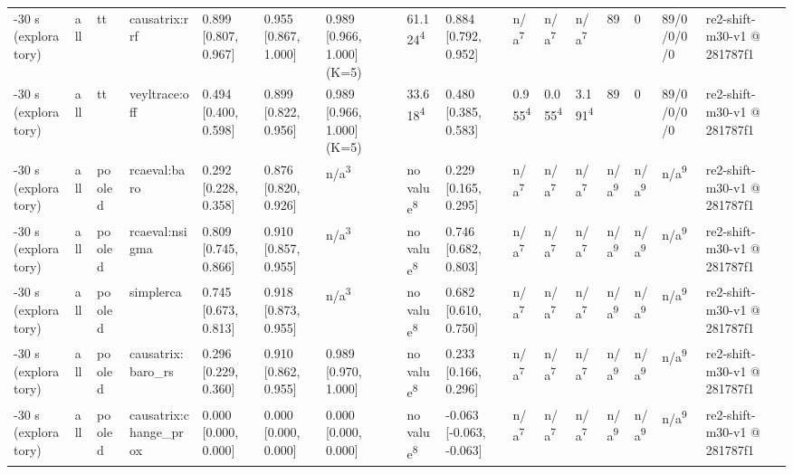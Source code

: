 \begin{table}[t]
\begin{tabular}{llllllllllllllll}
-30 s (exploratory) & all & tt & causatrix:rrf & 0.899 [0.807, 0.967] & 0.955 [0.867, 1.000] & 0.989 [0.966, 1.000] (K=5) & 61.124\textsuperscript{4} & 0.884 [0.792, 0.952] & n/a\textsuperscript{7} & n/a\textsuperscript{7} & n/a\textsuperscript{7} & 89 & 0 & 89/0/0/0/0 & re2-shift-m30-v1 @ 281787f1 \\
-30 s (exploratory) & all & tt & veyltrace:off & 0.494 [0.400, 0.598] & 0.899 [0.822, 0.956] & 0.989 [0.966, 1.000] (K=5) & 33.618\textsuperscript{4} & 0.480 [0.385, 0.583] & 0.955\textsuperscript{4} & 0.055\textsuperscript{4} & 3.191\textsuperscript{4} & 89 & 0 & 89/0/0/0/0 & re2-shift-m30-v1 @ 281787f1 \\
-30 s (exploratory) & all & pooled & rcaeval:baro & 0.292 [0.228, 0.358] & 0.876 [0.820, 0.926] & n/a\textsuperscript{3} & no value\textsuperscript{8} & 0.229 [0.165, 0.295] & n/a\textsuperscript{7} & n/a\textsuperscript{7} & n/a\textsuperscript{7} & n/a\textsuperscript{9} & n/a\textsuperscript{9} & n/a\textsuperscript{9} & re2-shift-m30-v1 @ 281787f1 \\
-30 s (exploratory) & all & pooled & rcaeval:nsigma & 0.809 [0.745, 0.866] & 0.910 [0.857, 0.955] & n/a\textsuperscript{3} & no value\textsuperscript{8} & 0.746 [0.682, 0.803] & n/a\textsuperscript{7} & n/a\textsuperscript{7} & n/a\textsuperscript{7} & n/a\textsuperscript{9} & n/a\textsuperscript{9} & n/a\textsuperscript{9} & re2-shift-m30-v1 @ 281787f1 \\
-30 s (exploratory) & all & pooled & simplerca & 0.745 [0.673, 0.813] & 0.918 [0.873, 0.955] & n/a\textsuperscript{3} & no value\textsuperscript{8} & 0.682 [0.610, 0.750] & n/a\textsuperscript{7} & n/a\textsuperscript{7} & n/a\textsuperscript{7} & n/a\textsuperscript{9} & n/a\textsuperscript{9} & n/a\textsuperscript{9} & re2-shift-m30-v1 @ 281787f1 \\
-30 s (exploratory) & all & pooled & causatrix:baro\_rs & 0.296 [0.229, 0.360] & 0.910 [0.862, 0.955] & 0.989 [0.970, 1.000] & no value\textsuperscript{8} & 0.233 [0.166, 0.296] & n/a\textsuperscript{7} & n/a\textsuperscript{7} & n/a\textsuperscript{7} & n/a\textsuperscript{9} & n/a\textsuperscript{9} & n/a\textsuperscript{9} & re2-shift-m30-v1 @ 281787f1 \\
-30 s (exploratory) & all & pooled & causatrix:change\_prox & 0.000 [0.000, 0.000] & 0.000 [0.000, 0.000] & 0.000 [0.000, 0.000] & no value\textsuperscript{8} & -0.063 [-0.063, -0.063] & n/a\textsuperscript{7} & n/a\textsuperscript{7} & n/a\textsuperscript{7} & n/a\textsuperscript{9} & n/a\textsuperscript{9} & n/a\textsuperscript{9} & re2-shift-m30-v1 @ 281787f1 \\

\end{tabular}
\end{table}
